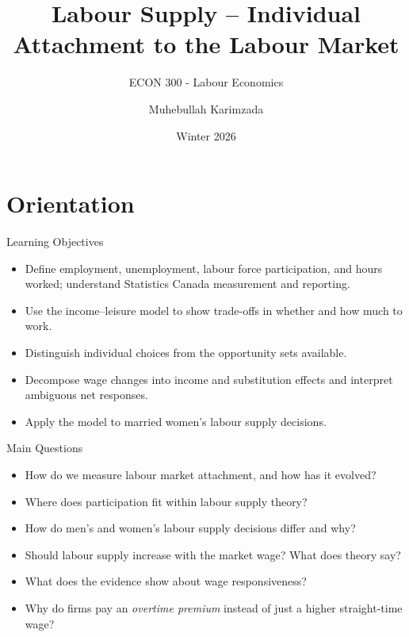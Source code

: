 \documentclass[aspectratio=169]{beamer}
\title{\textbf{Labour Supply -- Individual Attachment to the Labour Market \vspace{.5cm}\\  }}
\subtitle{ {\large ECON 300 - Labour Economics}}
\author{Muhebullah Karimzada}
\date{Winter 2026}
\begin{document}
\begin{frame}[plain]
  \titlepage
\end{frame}

\section{Orientation}

\begin{frame}{Learning Objectives}
\transfade
\begin{itemize}[<+->]
  \item Define employment, unemployment, labour force participation, and hours worked; understand Statistics Canada measurement and reporting.
  \item Use the income–leisure model to show trade-offs in whether and how much to work.
  \item Distinguish individual choices from the opportunity sets available.
  \item Decompose wage changes into income and substitution effects and interpret ambiguous net responses.
  \item Apply the model to married women’s labour supply decisions.
\end{itemize}

\end{frame}

\begin{frame}{Main Questions}
\transfade
\begin{itemize}[<+->]
  \item How do we measure labour market attachment, and how has it evolved?
  \item Where does participation fit within labour supply theory?
  \item How do men’s and women’s labour supply decisions differ and why?
  \item Should labour supply increase with the market wage? What does theory say?
  \item What does the evidence show about wage responsiveness?
  \item Why do firms pay an \textit{overtime premium} instead of just a higher straight-time wage?
\end{itemize}

\end{frame}
\end{document}

